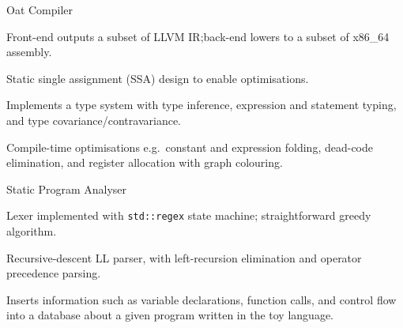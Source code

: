 \begin{cventries}
	{Oat Compiler} %
	{} %
	{} %
	{
		\begin{cvitems} %
			\item Front-end outputs a subset of LLVM IR;\@ back-end lowers to a subset of x86\_64 assembly.
			\item Static single assignment (SSA) design to enable optimisations.
			\item Implements a type system with type inference, expression and statement typing, and type covariance/contravariance.
			\item Compile-time optimisations e.g.\ constant and expression folding, dead-code elimination, and register allocation with graph colouring.
		\end{cvitems}
	}

	{Static Program Analyser} %
	{} %
	{} %
	{
		\begin{cvitems} %
			\item Lexer implemented with \texttt{std::regex} state machine; straightforward greedy algorithm.
			\item Recursive-descent LL parser, with left-recursion elimination and operator precedence parsing.
			\item Inserts information such as variable declarations, function calls, and control flow into a database about a given program written in the toy language.
		\end{cvitems}
	}

	\begin{flushleft}
	\end{flushleft}
\end{cventries}



